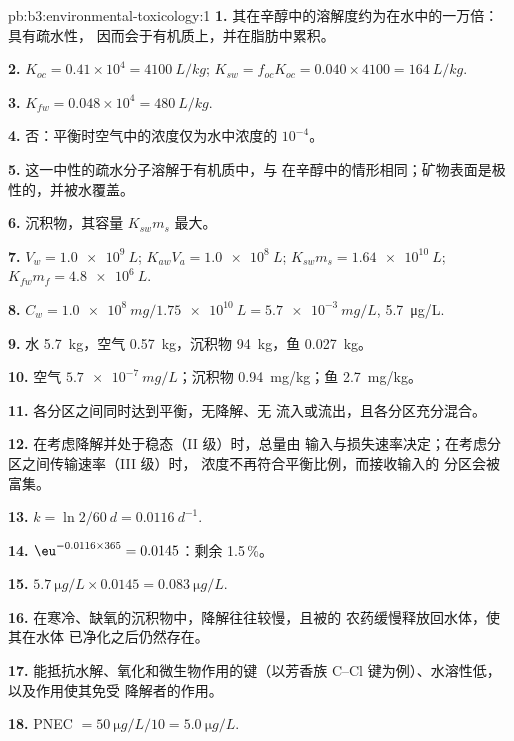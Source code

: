 \begin{solution}{pb:b3:environmental-toxicology:1}
\textbf{1.} 其在辛醇中的溶解度约为在水中的一万倍：具有疏水性，
因而会于有机质上，并在脂肪中累积。

\textbf{2.} $K_{oc} = 0.41 \times 10^4 = \qty{4100}{L/kg}$; $K_{sw} = f_{oc}K_{oc} = 0.040 \times 4100 = \qty{164}{L/kg}$.

\textbf{3.} $K_{fw} = 0.048 \times 10^4 = \qty{480}{L/kg}$.

\textbf{4.} 否：平衡时空气中的浓度仅为水中浓度的 $10^{-4}$。

\textbf{5.} 这一中性的疏水分子溶解于有机质中，与
在辛醇中的情形相同；矿物表面是极性的，并被水覆盖。

\textbf{6.} 沉积物，其容量 $K_{sw}m_s$ 最大。

\textbf{7.} $V_w = \qty{1.0e9}{L}$; $K_{aw}V_a = \qty{1.0e8}{L}$; $K_{sw}m_s = \qty{1.64e10}{L}$; $K_{fw}m_f = \qty{4.8e6}{L}$.

\textbf{8.} $C_w = \qty{1.0e8}{mg}/\qty{1.75e10}{L} = \qty{5.7e-3}{mg/L}$, \qty{5.7}{\micro g/L}.

\textbf{9.} 水 \qty{5.7}{kg}，空气 \qty{0.57}{kg}，沉积物 \qty{94}{kg}，鱼 \qty{0.027}{kg}。

\textbf{10.} 空气 $\qty{5.7e-7}{mg/L}$；沉积物 \qty{0.94}{mg/kg}；鱼 \qty{2.7}{mg/kg}。

\textbf{11.} 各分区之间同时达到平衡，无降解、无
流入或流出，且各分区充分混合。

\textbf{12.} 在考虑降解并处于稳态（II 级）时，总量由
输入与损失速率决定；在考虑分区之间传输速率（III 级）时，
浓度不再符合平衡比例，而接收输入的
分区会被富集。

\textbf{13.} $k = \ln 2/\qty{60}{d} = \qty{0.0116}{d^{-1}}$.

\textbf{14.} $\eu^{-0.0116 \times 365} = 0.0145$：剩余 1.5\,\%。

\textbf{15.} $\qty{5.7}{\micro g/L} \times 0.0145 = \qty{0.083}{\micro g/L}$.

\textbf{16.} 在寒冷、缺氧的沉积物中，降解往往较慢，且被的
农药缓慢释放回水体，使其在水体
已净化之后仍然存在。

\textbf{17.} 能抵抗水解、氧化和微生物作用的键（以芳香族
C--Cl 键为例）、水溶性低，以及作用使其免受
降解者的作用。

\textbf{18.} PNEC $= \qty{50}{\micro g/L}/10 = \qty{5.0}{\micro g/L}$.


\end{solution}
